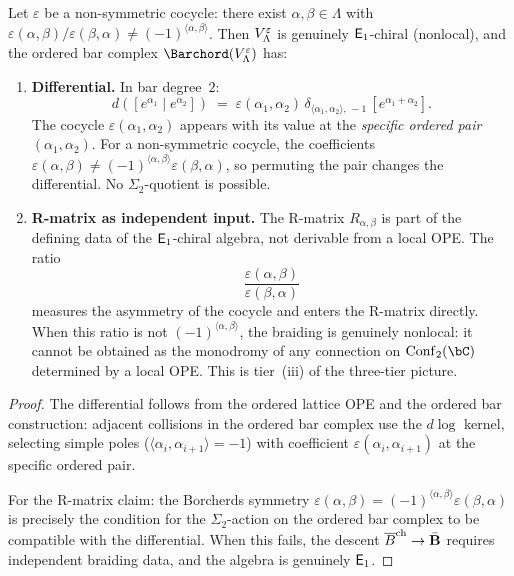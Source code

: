 \begin{theorem}
\label{thm:lattice-nonsymmetric-ordered-bar}
Let $\varepsilon$ be a non-symmetric cocycle: there exist
$\alpha, \beta \in \Lambda$ with
$\varepsilon(\alpha,\beta)/\varepsilon(\beta,\alpha) \neq
(-1)^{\langle\alpha,\beta\rangle}$. Then
$V_\Lambda^\varepsilon$ is genuinely $\mathsf{E}_1$-chiral
\textup{(}nonlocal\textup{)},
and the ordered bar complex $\Barchord(\Vlat_\Lambda^\varepsilon)$ has:

\begin{enumerate}[label=\textup{(\arabic*)}]
\item \textbf{Differential.} In bar degree~$2$:
\begin{equation}\label{eq:lattice-nonsym-diff}
d([e^{\alpha_1} \mid e^{\alpha_2}])
\;=\; \varepsilon(\alpha_1,\alpha_2)\,
 \delta_{\langle\alpha_1,\alpha_2\rangle,\,-1}\,
 [e^{\alpha_1 + \alpha_2}].
\end{equation}
The cocycle $\varepsilon(\alpha_1,\alpha_2)$ appears with its value at
the \emph{specific ordered pair} $(\alpha_1, \alpha_2)$. For a
non-symmetric cocycle, the coefficients
$\varepsilon(\alpha,\beta) \neq
(-1)^{\langle\alpha,\beta\rangle}\varepsilon(\beta,\alpha)$, so
permuting the pair changes the differential. No $\Sigma_2$-quotient is
possible.

\item \textbf{R-matrix as independent input.}
The R-matrix $R_{\alpha,\beta}$ is part of the defining data of the
$\mathsf{E}_1$-chiral algebra, not derivable from a local OPE. The ratio
\begin{equation}\label{eq:lattice-nonsym-rmatrix-ratio}
\frac{\varepsilon(\alpha,\beta)}{\varepsilon(\beta,\alpha)}
\end{equation}
measures the asymmetry of the cocycle and enters the R-matrix directly.
When this ratio is not $(-1)^{\langle\alpha,\beta\rangle}$, the
braiding is genuinely nonlocal: it cannot be obtained as the monodromy
of any connection on $\operatorname{Conf}_2(\bC)$ determined by a local
OPE. This is tier~(iii) of the three-tier picture.
\end{enumerate}
\end{theorem}

\begin{proof}
The differential follows from the ordered lattice OPE and the ordered
bar construction: adjacent collisions in the ordered bar complex use the
$d\log$ kernel, selecting simple poles
($\langle\alpha_i,\alpha_{i+1}\rangle = -1$) with coefficient
$\varepsilon(\alpha_i, \alpha_{i+1})$ at the specific ordered pair.

For the R-matrix claim: the Borcherds symmetry
$\varepsilon(\alpha,\beta) =
(-1)^{\langle\alpha,\beta\rangle}\varepsilon(\beta,\alpha)$
is precisely the condition for the $\Sigma_2$-action on the ordered bar
complex to be compatible with the differential. When this fails, the
descent $\overline{B}^{\mathrm{ch}} \to \bar{\mathbf{B}}$ requires independent braiding data, and
the algebra is genuinely $\mathsf{E}_1$.
\end{proof}

